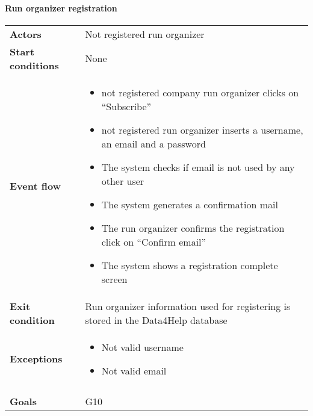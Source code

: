 \paragraph{Run organizer registration}
\begin{center}
\begin{table}[H]
\centering
\begin{tabular}{l|l}
\textbf{Actors} & Not registered run organizer \\
\textbf{Start conditions} & None \\
\textbf{Event flow}  & \begin{minipage}[t]{0.7\textwidth}
    \begin{itemize}
       \item not registered company run organizer clicks on “Subscribe”
\item not registered run organizer inserts a username, an email and a password
\item The system checks if email is not used by any other user
\item The system generates a confirmation mail
\item The run organizer confirms the registration click on “Confirm email”
\item The system shows a registration complete screen


    \end{itemize}
    
\end{minipage} \\
\textbf{Exit condition} & Run organizer information used for registering is stored in the Data4Help database \\
\textbf{Exceptions} & \begin{minipage}[t]{0.7\textwidth}
    \begin{itemize}
       \item Not valid username
\item Not valid email
    \end{itemize}
    
\end{minipage} \\ \\
\textbf{Goals} & G10
\end{tabular}

\end{table}
\end{center}

